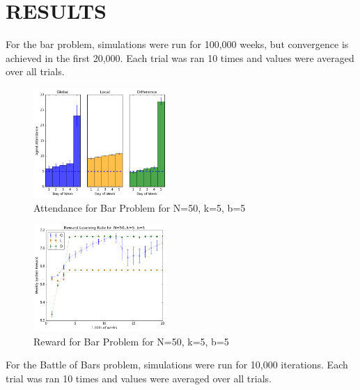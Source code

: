 \documentclass[letterpaper, 10 pt, conference]{ieeeconf}  %
\begin{document}
\section{RESULTS}
For the bar problem, simulations were run for 100,000 weeks, but convergence is achieved in the first 20,000.  Each trial was ran 10 times and values were averaged over all trials.
\begin{figure}[h]
\centering
\includegraphics[width=0.45\textwidth]{Histograms0}
\caption{Attendance for Bar Problem for N=50, k=5, b=5}
\label{hist0}
\end{figure}

\begin{figure}[h]
\centering
\includegraphics[width=0.45\textwidth]{Scatter0}
\caption{Reward for Bar Problem for N=50, k=5, b=5}
\label{scatter0}
\end{figure}

For the Battle of Bars problem, simulations were run for 10,000 iterations. Each trial was ran 10 times and values were averaged over all trials.
\end{document}
